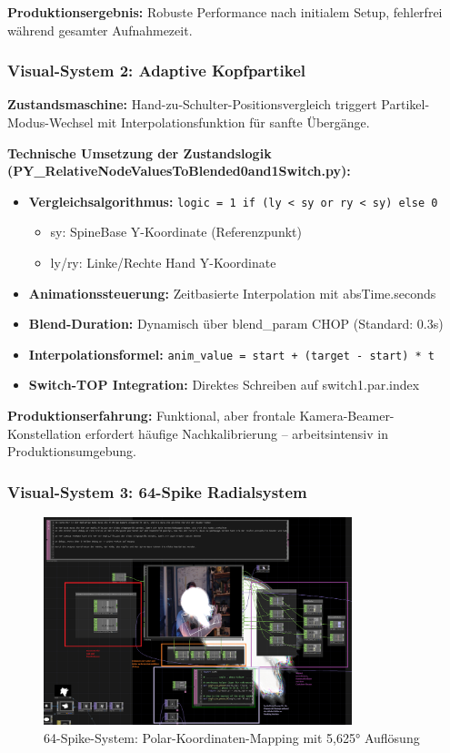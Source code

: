 \textbf{Produktionsergebnis:} Robuste Performance nach initialem Setup, fehlerfrei während gesamter Aufnahmezeit.

\subsubsection{Visual-System 2: Adaptive Kopfpartikel}

\textbf{Zustandsmaschine:} Hand-zu-Schulter-Positionsvergleich triggert Partikel-Modus-Wechsel mit Interpolationsfunktion für sanfte Übergänge.

\textbf{Technische Umsetzung der Zustandslogik (PY\_RelativeNodeValuesToBlended0and1Switch.py):}
\begin{itemize}
    \item \textbf{Vergleichsalgorithmus:} \texttt{logic = 1 if (ly < sy or ry < sy) else 0}
    \begin{itemize}
        \item sy: SpineBase Y-Koordinate (Referenzpunkt)
        \item ly/ry: Linke/Rechte Hand Y-Koordinate
    \end{itemize}
    \item \textbf{Animationssteuerung:} Zeitbasierte Interpolation mit absTime.seconds
    \item \textbf{Blend-Duration:} Dynamisch über blend\_param CHOP (Standard: 0.3s)
    \item \textbf{Interpolationsformel:} \texttt{anim\_value = start + (target - start) * t}
    \item \textbf{Switch-TOP Integration:} Direktes Schreiben auf switch1.par.index
\end{itemize}

\textbf{Produktionserfahrung:} Funktional, aber frontale Kamera-Beamer-Konstellation erfordert häufige Nachkalibrierung – arbeitsintensiv in Produktionsumgebung.

\subsubsection{Visual-System 3: 64-Spike Radialsystem}

\begin{figure}[h]
    \centering
    \includegraphics[width=0.8\textwidth]{images/docupictures/TopDown_KreisZuRampsParametisierteBerechnungen.png}
    \caption{64-Spike-System: Polar-Koordinaten-Mapping mit 5,625° Auflösung}
    \label{fig:spike_system_production}
\end{figure}

